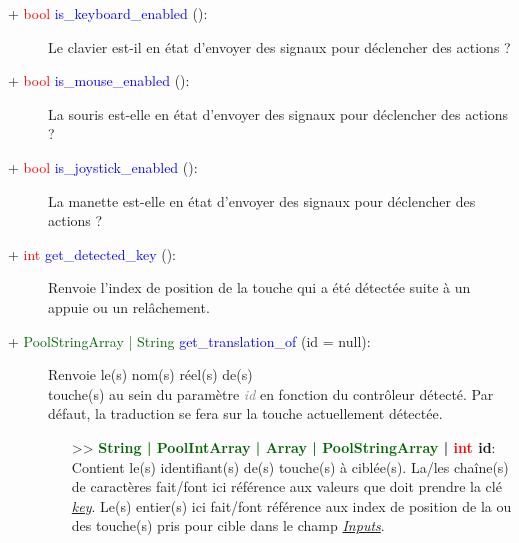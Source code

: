 \documentclass[a4paper, 11pt]{article}
\begin{document}
	\begin{description}
		\item [+ \textcolor{red}{bool} \textcolor{blue}{is\_keyboard\_enabled} ():] Le clavier est-il en 
		état d'envoyer des signaux pour déclencher des actions ?\\
	\end{description}
	\begin{description}
		\item [+ \textcolor{red}{bool} \textcolor{blue}{is\_mouse\_enabled} ():] La souris est-elle en état 
		d'envoyer des signaux pour déclencher des actions ?\\
	\end{description}
	\begin{description}
		\item [+ \textcolor{red}{bool} \textcolor{blue}{is\_joystick\_enabled} ():] La manette est-elle en 
		état d'envoyer des signaux pour déclencher des actions ?\\
	\end{description}
	\begin{description}
		\item [+ \textcolor{red}{int} \textcolor{blue}{get\_detected\_key} ():] Renvoie l'index de position
		de la touche qui a été détectée suite à un appuie ou un relâchement.\\
	\end{description}
	\begin{description}
		\item [+ \textcolor{darkgreen}{PoolStringArray | String} \textcolor{blue}{get\_translation\_of} 
		(id = null):] Renvoie le(s) nom(s) réel(s) de(s) \\touche(s) au sein du paramètre \textcolor{gray}
		{\textit{id}} en fonction du contrôleur détecté. Par défaut, la traduction se fera sur la touche 
		actuellement détectée.
		\begin{itemize}
			\item [>> \textbf{\textcolor{darkgreen}{String | PoolIntArray | Array | PoolStringArray} |
			\textcolor{red}{int} id}:] Contient le(s) identifiant(s) de(s) touche(s) à ciblée(s). La/les 
			chaîne(s) de caractères fait/font ici référence aux valeurs que doit prendre la clé 
			\textit{\hyperlink{key}{key}}. Le(s) entier(s) ici fait/font référence aux index de position de 
			la ou des touche(s) pris pour cible dans le champ \textit{\hyperlink{inputs}{Inputs}}.\\
		\end{itemize}
	\end{description}
\end{document}
